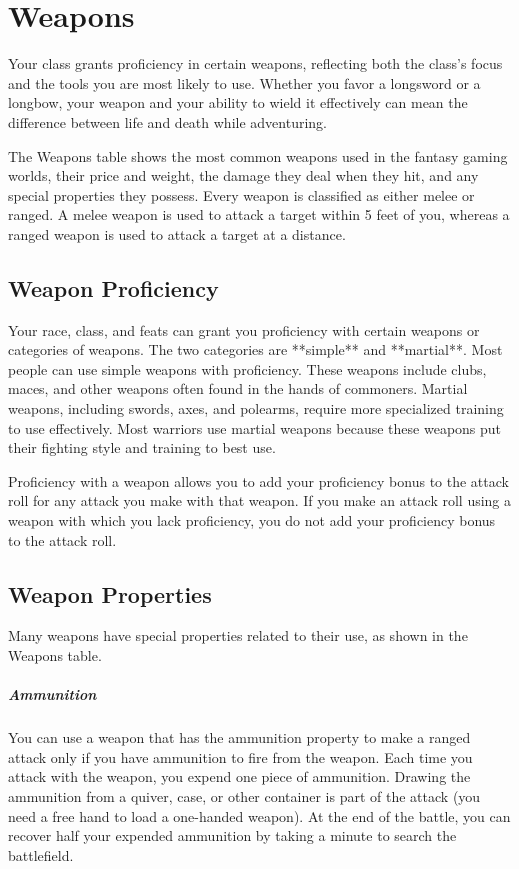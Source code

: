 \section{Weapons}

Your class grants proficiency in certain weapons, reflecting both the class's focus and the tools you are most likely to use. Whether you favor a longsword or a longbow, your weapon and your ability to wield it effectively can mean the difference between life and death while adventuring.

The Weapons table shows the most common weapons used in the fantasy gaming worlds, their price and weight, the damage they deal when they hit, and any special properties they possess. Every weapon is classified as either melee or ranged. A melee weapon is used to attack a target within 5 feet of you, whereas a ranged weapon is used to attack a target at a distance.

\subsection{Weapon Proficiency}

Your race, class, and feats can grant you proficiency with certain weapons or categories of weapons. The two categories are **simple** and **martial**. Most people can use simple weapons with proficiency. These weapons include clubs, maces, and other weapons often found in the hands of commoners. Martial weapons, including swords, axes, and polearms, require more specialized training to use effectively. Most warriors use martial weapons because these weapons put their fighting style and training to best use.

Proficiency with a weapon allows you to add your proficiency bonus to the attack roll for any attack you make with that weapon. If you make an attack roll using a weapon with which you lack proficiency, you do not add your proficiency bonus to the attack roll.

\subsection{Weapon Properties}

Many weapons have special properties related to their use, as shown in the Weapons table.

\subparagraph*{Ammunition} You can use a weapon that has the ammunition property to make a ranged attack only if you have ammunition to fire from the weapon. Each time you attack with the weapon, you expend one piece of ammunition. Drawing the ammunition from a quiver, case, or other container is part of the attack (you need a free hand to load a one-handed weapon). At the end of the battle, you can recover half your expended ammunition by taking a minute to search the battlefield.

